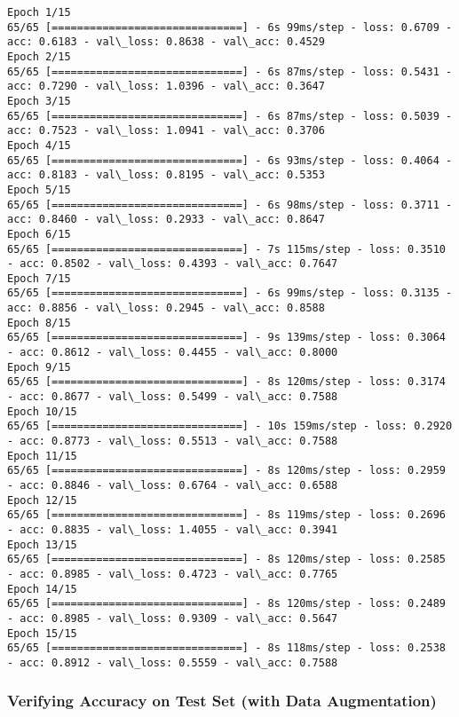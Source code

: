 \documentclass[11pt]{article}
\begin{document}
    \begin{Verbatim}[commandchars=\\\{\}]
Epoch 1/15
65/65 [==============================] - 6s 99ms/step - loss: 0.6709 - acc: 0.6183 - val\_loss: 0.8638 - val\_acc: 0.4529
Epoch 2/15
65/65 [==============================] - 6s 87ms/step - loss: 0.5431 - acc: 0.7290 - val\_loss: 1.0396 - val\_acc: 0.3647
Epoch 3/15
65/65 [==============================] - 6s 87ms/step - loss: 0.5039 - acc: 0.7523 - val\_loss: 1.0941 - val\_acc: 0.3706
Epoch 4/15
65/65 [==============================] - 6s 93ms/step - loss: 0.4064 - acc: 0.8183 - val\_loss: 0.8195 - val\_acc: 0.5353
Epoch 5/15
65/65 [==============================] - 6s 98ms/step - loss: 0.3711 - acc: 0.8460 - val\_loss: 0.2933 - val\_acc: 0.8647
Epoch 6/15
65/65 [==============================] - 7s 115ms/step - loss: 0.3510 - acc: 0.8502 - val\_loss: 0.4393 - val\_acc: 0.7647
Epoch 7/15
65/65 [==============================] - 6s 99ms/step - loss: 0.3135 - acc: 0.8856 - val\_loss: 0.2945 - val\_acc: 0.8588
Epoch 8/15
65/65 [==============================] - 9s 139ms/step - loss: 0.3064 - acc: 0.8612 - val\_loss: 0.4455 - val\_acc: 0.8000
Epoch 9/15
65/65 [==============================] - 8s 120ms/step - loss: 0.3174 - acc: 0.8677 - val\_loss: 0.5499 - val\_acc: 0.7588
Epoch 10/15
65/65 [==============================] - 10s 159ms/step - loss: 0.2920 - acc: 0.8773 - val\_loss: 0.5513 - val\_acc: 0.7588
Epoch 11/15
65/65 [==============================] - 8s 120ms/step - loss: 0.2959 - acc: 0.8846 - val\_loss: 0.6764 - val\_acc: 0.6588
Epoch 12/15
65/65 [==============================] - 8s 119ms/step - loss: 0.2696 - acc: 0.8835 - val\_loss: 1.4055 - val\_acc: 0.3941
Epoch 13/15
65/65 [==============================] - 8s 120ms/step - loss: 0.2585 - acc: 0.8985 - val\_loss: 0.4723 - val\_acc: 0.7765
Epoch 14/15
65/65 [==============================] - 8s 120ms/step - loss: 0.2489 - acc: 0.8985 - val\_loss: 0.9309 - val\_acc: 0.5647
Epoch 15/15
65/65 [==============================] - 8s 118ms/step - loss: 0.2538 - acc: 0.8912 - val\_loss: 0.5559 - val\_acc: 0.7588

    \end{Verbatim}

    \subsubsection{Verifying Accuracy on Test Set (with Data
Augmentation)}\label{verifying-accuracy-on-test-set-with-data-augmentation}
\end{document}
